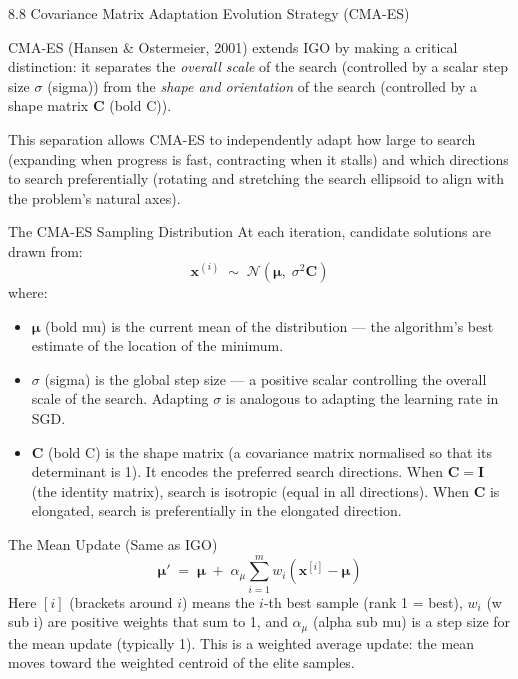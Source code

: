 \documentclass[aspectratio=169,10pt]{beamer}
\begin{document}
\begin{frame}[allowframebreaks]{8.8 Covariance Matrix Adaptation Evolution Strategy (CMA-ES)}

CMA-ES (Hansen \& Ostermeier, 2001) extends IGO by making a critical distinction: it separates the \emph{overall scale} of the search (controlled by a scalar step size $\sigma$ (sigma)) from the \emph{shape and orientation} of the search (controlled by a shape matrix $\mathbf{C}$ (bold C)).

This separation allows CMA-ES to independently adapt how large to search (expanding when progress is fast, contracting when it stalls) and which directions to search preferentially (rotating and stretching the search ellipsoid to align with the problem's natural axes).

\begin{block}{The CMA-ES Sampling Distribution}
At each iteration, candidate solutions are drawn from:
\[
  \mathbf{x}^{(i)} \;\sim\; \mathcal{N}\!\left(\bm{\mu},\; \sigma^2 \mathbf{C}\right)
\]
where:
\begin{itemize}
  \item $\bm{\mu}$ (bold mu) is the current mean of the distribution --- the algorithm's best estimate of the location of the minimum.
  \item $\sigma$ (sigma) is the global step size --- a positive scalar controlling the overall scale of the search. Adapting $\sigma$ is analogous to adapting the learning rate in SGD.
  \item $\mathbf{C}$ (bold C) is the shape matrix (a covariance matrix normalised so that its determinant is 1). It encodes the preferred search directions. When $\mathbf{C} = \mathbf{I}$ (the identity matrix), search is isotropic (equal in all directions). When $\mathbf{C}$ is elongated, search is preferentially in the elongated direction.
\end{itemize}
\end{block}

\begin{block}{The Mean Update (Same as IGO)}
\[
  \bm{\mu}' \;=\; \bm{\mu} \;+\; \alpha_\mu \sum_{i=1}^{m} w_i\!\left(\mathbf{x}^{[i]} - \bm{\mu}\right)
\]
Here $[i]$ (brackets around $i$) means the $i$-th best sample (rank 1 = best), $w_i$ (w sub i) are positive weights that sum to 1, and $\alpha_\mu$ (alpha sub mu) is a step size for the mean update (typically 1). This is a weighted average update: the mean moves toward the weighted centroid of the elite samples.
\end{block}


\end{frame}
\end{document}
